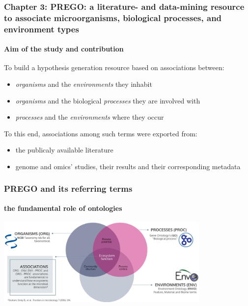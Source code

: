 \documentclass{beamer}
\begin{document}
    \begin{darkframes}
      \begin{frame}
         \frametitle{\textbf{Chapter 3}: PREGO: a literature- and data-mining
         resource to associate microorganisms,
         biological processes, and
         environment types}
         \framesubtitle{Aim of the study and contribution}

         \small
            To build a hypothesis generation resource based on associations between: 
            \begin{itemize}
               \item \textit{organisms} and the \textit{environments} they inhabit
               \item \textit{organisms} and the biological \textit{processes} they are involved with
               \item \textit{processes} and the \textit{environments} where they occur
            \end{itemize}

            To this end, associations among such terms were exported from: 
            \begin{itemize}
               \item the publicaly available literature
               \item genome and omics' studies, their results and their corresponding metadata
            \end{itemize}

      \end{frame}
   \end{darkframes}

   \begin{frame}
      \frametitle{PREGO and its referring terms}
      \framesubtitle{the fundamental role of ontologies}
      \includegraphics[width=105mm]{resources/prego_triple_associations.png}
   \end{frame}
\end{document}
